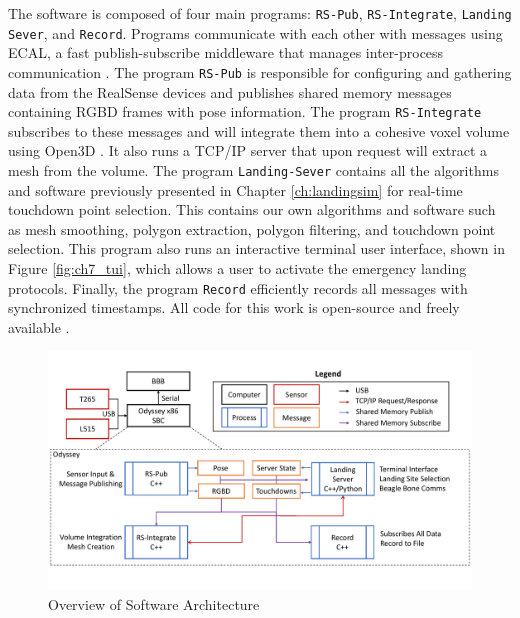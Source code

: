 The software is composed of four main programs: \texttt{RS-Pub}, \texttt{RS-Integrate}, \texttt{Landing Sever}, and \texttt{Record}. Programs communicate with each other with messages using \ac{ECAL}, a fast publish-subscribe middleware that manages inter-process communication \cite{Continental_Github_ecal}. The program \texttt{RS-Pub} is responsible for configuring and gathering data from the RealSense devices and publishes shared memory messages containing \ac{RGBD} frames with pose information. The program \texttt{RS-Integrate} subscribes to these messages and will integrate them into a cohesive voxel volume using Open3D \cite{zhou_open3d_2018}. It also runs a TCP/IP server that upon request will extract a mesh from the volume. The program \texttt{Landing-Sever} contains all the algorithms and software previously presented in Chapter \ref{ch:landingsim} for real-time touchdown point selection. This contains our own algorithms and software such as mesh smoothing, polygon extraction, polygon filtering, and touchdown point selection. This program also runs an interactive terminal user interface, shown in Figure \ref{fig:ch7_tui}, which allows a user to activate the emergency landing protocols. Finally, the program \texttt{Record} efficiently records all messages with synchronized timestamps. All code for this work is open-source and freely available \cite{Castagno_Github_realsensepackage}.

\begin{figure}[!tb]
    \centering  
    \includegraphics[page=1,clip,trim=0cm 0cm 0cm 0cm,width=.95\linewidth]{chapter_7_experiments/imgs/SoftwareOverview.pdf}
    \caption[Overview of hardware interfaces and software architecture]{Overview of Software Architecture}\label{fig:ch7_software}
\end{figure}

